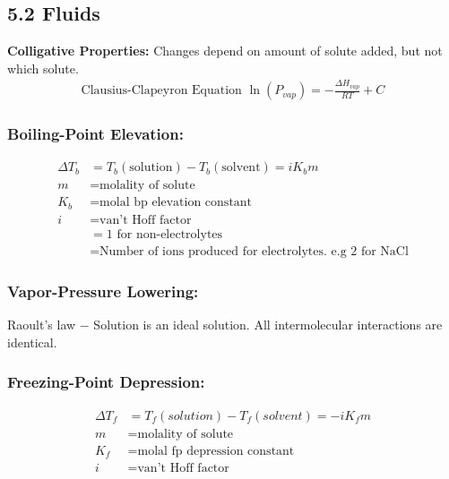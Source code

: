 \subsection{5.2 Fluids}
    \textbf{Colligative Properties: }Changes depend on amount of solute added, but not which solute.
    \vspace*{-0.5em}
    \begin{align*}
        \textrm{Clausius-Clapeyron Equation } \ln(P_{vap}) = - \frac{\Delta H_{vap}}{RT} + C
    \end{align*}
    \vspace*{0.0em}
    
    \subsubsection{Boiling-Point Elevation: }
        \begin{align*}
            \Delta T_b & = T_b (\textrm{solution}) - T_b (\textrm{solvent}) = iK_b m\\
            m & = \text{molality of solute}\\
            K_b & = \text{molal bp elevation constant}\\
            i & = \text{van't Hoff factor}\\
            & = 1 \text{ for non-electrolytes}\\
            & = \text{Number of ions produced for electrolytes.\ e.g 2 for NaCl}
        \end{align*}
    
    \subsubsection{Vapor-Pressure Lowering: }
    
        Raoult's law $-$ Solution is an ideal solution. All intermolecular interactions are identical. 

    \subsubsection{Freezing-Point Depression: }
        \begin{align*}
            \Delta T_f & = T_f (solution) - T_f (solvent) = -iK_{f}m\\
            m & = \text{molality of solute}\\
            K_f & = \text{molal fp depression constant}\\
            i & = \text{van't Hoff factor}
        \end{align*}